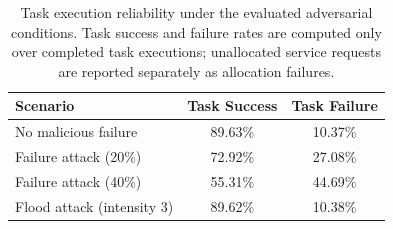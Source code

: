 \begin{table}[t]
\centering
\caption{Task execution reliability under the evaluated adversarial conditions. Task success and failure rates are computed only over completed task executions; unallocated service requests are reported separately as allocation failures.}
\label{tab:task_reliability}
\begin{tabular}{lcc}
\hline
Scenario & Task Success & Task Failure \\
\hline
No malicious failure & 89.63\% & 10.37\% \\
Failure attack (20\%) & 72.92\% & 27.08\% \\
Failure attack (40\%) & 55.31\% & 44.69\% \\
Flood attack (intensity 3) & 89.62\% & 10.38\% \\
\hline
\end{tabular}
\end{table}